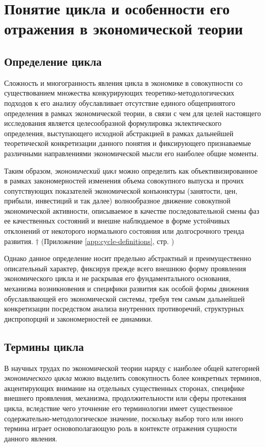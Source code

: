 \section{Понятие цикла и особенности его отражения в экономической теории}

\subsection{Определение цикла}
Сложность и многогранность явления цикла в экономике в совокупности со существованием множества конкурирующих теоретико-методологических подходов к его анализу обуславливает отсутствие единого общепринятого определения в рамках экономической теории, в связи с чем для целей настоящего исследования является целесообразной формулировка эклектического определения, выступающего исходной абстракцией в рамках дальнейшей теоретической конкретизации данного понятия и фиксирующего признаваемые различными направлениями экономической мысли его наиболее общие моменты.

Таким образом, \textit{экономический цикл} можно определить как объективизированное в рамках закономерностей изменения объема совокупного выпуска и прочих сопутствующих показателей экономической конъюнктуры (занятости, цен, прибыли, инвестиций и так далее) волнообразное движение совокупной экономической активности, описываемое в качестве последовательной смены фаз ее качественных состояний и внешне наблюдаемое в форме устойчивых отклонений от некоторого \textquotedbl{}нормального\textquotedbl{} состояния или долгосрочного тренда развития. $\dagger$ (Приложение \ref{app:cycle-definitions}, стр. \pageref{app:cycle-definitions})

Однако данное определение носит предельно абстрактный и преимущественно описательный характер, фиксируя прежде всего внешнюю форму проявления экономического цикла и не раскрывая его фундаментального основания, механизма возникновения и специфики развития как особой формы движения обуславлвающей его экономической системы, требуя тем самым дальнейшей конкретизации посредством анализа внутренних противоречий, структурных диспропорций и закономерностей ее динамики.

\subsection{Термины цикла}
В научных трудах по экономической теории наряду с наиболее общей категорией \textit{экономического цикла} можно выделить совокупность более конкретных терминов, акцентирующих внимание на отдельных существенных сторонах, специфике внешнего проявления, механизма, продолжительности или сферы протекания цикла, вследствие чего уточнение его терминологии имеет существенное содержательно-методологическое значение, поскольку выбор того или иного термина играет основополагающую роль в контексте отражения сущности данного явления.

